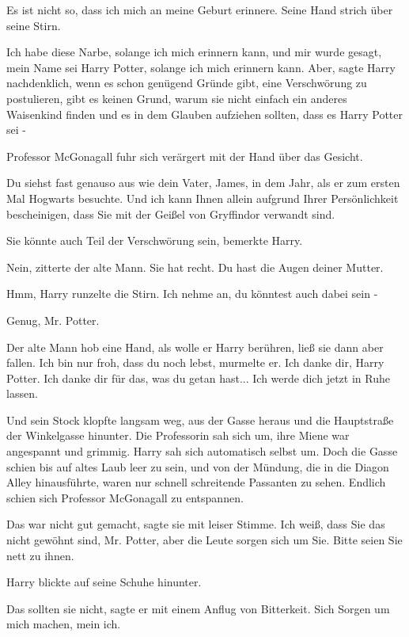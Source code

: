 \glqq{}Es ist nicht so, dass ich mich an meine Geburt erinnere.\grqq{} Seine Hand
strich über seine Stirn.

\glqq{}Ich habe diese Narbe, solange ich mich erinnern kann, und mir wurde
gesagt, mein Name sei Harry Potter, solange ich mich erinnern kann. Aber\grqq{},
sagte Harry nachdenklich, \glqq{}wenn es schon genügend Gründe gibt, eine
Verschwörung zu postulieren, gibt es keinen Grund, warum sie nicht einfach ein
anderes Waisenkind finden und es in dem Glauben aufziehen sollten, dass es Harry
Potter sei -\grqq{}

Professor McGonagall fuhr sich verärgert mit der Hand über das Gesicht.

\glqq{}Du siehst fast genauso aus wie dein Vater, James, in dem Jahr, als er zum
ersten Mal Hogwarts besuchte. Und ich kann Ihnen allein aufgrund Ihrer
Persönlichkeit bescheinigen, dass Sie mit der Geißel von Gryffindor verwandt
sind.\grqq{}

\glqq{}Sie könnte auch Teil der Verschwörung sein\grqq{}, bemerkte Harry.

\glqq{}Nein\grqq{}, zitterte der alte Mann. \glqq{}Sie hat recht. Du hast die
Augen deiner Mutter.\grqq{}

\glqq{}Hmm\grqq{}, Harry runzelte die Stirn. \glqq{}Ich nehme an, du könntest auch
dabei sein -\grqq{}

\glqq{}Genug, Mr. Potter.\grqq{}

Der alte Mann hob eine Hand, als wolle er Harry berühren, ließ sie dann aber
fallen. \glqq{}Ich bin nur froh, dass du noch lebst\grqq{}, murmelte er. \glqq{}
Ich danke dir, Harry Potter. Ich danke dir für das, was du getan hast... Ich
werde dich jetzt in Ruhe lassen.\grqq{}

Und sein Stock klopfte langsam weg, aus der Gasse heraus und die Hauptstraße der
Winkelgasse hinunter. Die Professorin sah sich um, ihre Miene war angespannt und
grimmig. Harry sah sich automatisch selbst um. Doch die Gasse schien bis auf
altes Laub leer zu sein, und von der Mündung, die in die Diagon Alley
hinausführte, waren nur schnell schreitende Passanten zu sehen. Endlich schien
sich Professor McGonagall zu entspannen.

\glqq{}Das war nicht gut gemacht\grqq{}, sagte sie mit leiser Stimme. \glqq{}Ich
weiß, dass Sie das nicht gewöhnt sind, Mr. Potter, aber die Leute sorgen sich um
Sie. Bitte seien Sie nett zu ihnen.\grqq{}

Harry blickte auf seine Schuhe hinunter.

\glqq{}Das sollten sie nicht\grqq{}, sagte er mit einem Anflug von Bitterkeit.
\glqq{}Sich Sorgen um mich machen, mein ich.\grqq{}

